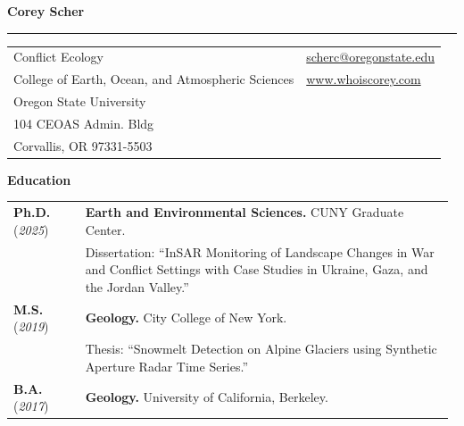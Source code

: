 \documentclass[letterpaper,11pt,oneside]{article}
\begin{document}
\thispagestyle{plain} 
\noindent  \LARGE{\textbf{Corey Scher}} \\
\vspace{-2ex}
\hrule
\normalsize

\begin{center}
\begin{tabular}{l l}
 Conflict Ecology & \hspace{1in} \href{mailto:scherc@oregonstate.edu}{scherc@oregonstate.edu} \\
 College of Earth, Ocean, and Atmospheric Sciences    & \hspace{1in}  \href{https://www.whoiscorey.com}{www.whoiscorey.com} \\
 Oregon State University & \\
 104 CEOAS Admin. Bldg & \\
Corvallis, OR 97331-5503 & \\
\end{tabular}
\end{center}

\begin{flushleft}\textbf{\Large{Education}}\end{flushleft}
\vspace{-4ex}
\begin{longtable}{@{}p{0.16\linewidth}p{0.82\linewidth}@{}}

\textbf{Ph.D.} (\textit{2025}) & \textbf{Earth and Environmental Sciences.} CUNY Graduate Center.\\
& Dissertation: “InSAR Monitoring of Landscape Changes in War and Conflict Settings with Case Studies in Ukraine, Gaza, and the Jordan Valley.”\\[1.0ex]

\textbf{M.S.} (\textit{2019}) & \textbf{Geology.} City College of New York.\\
& Thesis: “Snowmelt Detection on Alpine Glaciers using Synthetic Aperture Radar Time Series.”\\[1.0ex]

\textbf{B.A.} (\textit{2017}) & \textbf{Geology.} University of California, Berkeley.\\[1.0ex]

\end{longtable}
\end{document}
